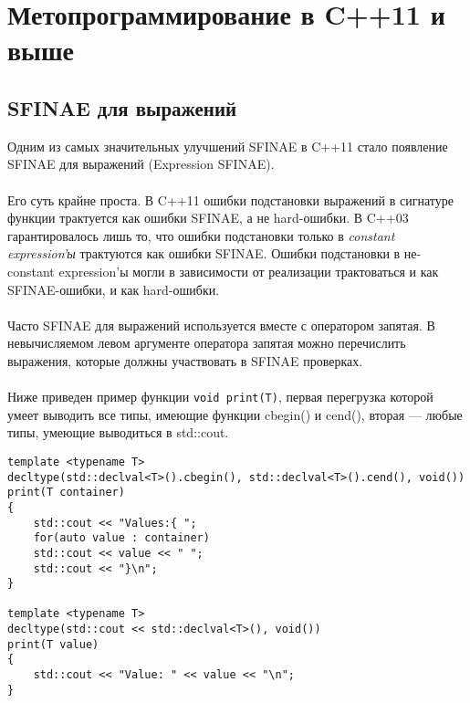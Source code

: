 \section{Метопрограммирование в C++11 и выше}
\subsection{SFINAE для выражений}
Одним из самых значительных улучшений SFINAE в C++11 стало появление SFINAE для выражений (Expression SFINAE). \\\\
Его суть крайне проста. В C++11 ошибки подстановки выражений в сигнатуре функции трактуется как ошибки SFINAE, а не hard-ошибки.
В C++03 гарантировалось лишь то, что ошибки подстановки только в \textit{constant expression'ы} трактуются как ошибки SFINAE. Ошибки подстановки в не-constant expression'ы могли в зависимости от реализации трактоваться и как SFINAE-ошибки, и как hard-ошибки. \\\\
Часто SFINAE для выражений используется вместе с оператором запятая. В невычисляемом левом аргументе оператора запятая можно перечислить выражения, которые должны участвовать в SFINAE проверках. \\\\
Ниже приведен пример функции \texttt{void print(T)}, первая перегрузка которой умеет выводить все типы, имеющие функции cbegin() и cend(), вторая --- любые типы, умеющие выводиться в std::cout.
\begin{verbatim}
template <typename T>
decltype(std::declval<T>().cbegin(), std::declval<T>().cend(), void())
print(T container)
{
	std::cout << "Values:{ ";
	for(auto value : container)
	std::cout << value << " ";
	std::cout << "}\n";
}

template <typename T>
decltype(std::cout << std::declval<T>(), void())
print(T value)
{
	std::cout << "Value: " << value << "\n";
}	
\end{verbatim}
